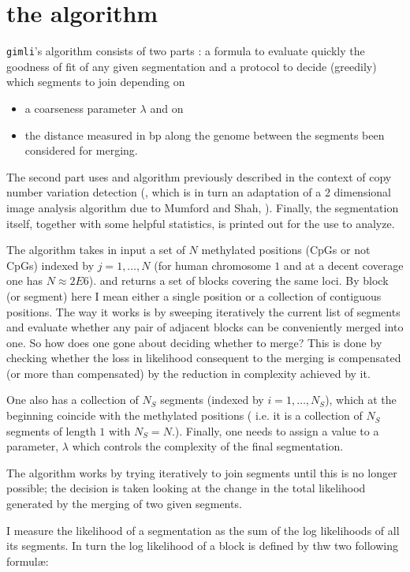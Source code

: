 \documentclass[11pt]{amsart}
\newcommand{\gimli}{\texttt{gimli}}
\begin{document}
\section{the algorithm}

\gimli's algorithm consists of two parts : 
a formula to evaluate quickly the 
goodness of fit of any given segmentation
and a protocol to decide (greedily) which  segments to join depending on
\begin{itemize}
\item{}a coarseness parameter $\lambda$ and on 
\item{}the distance measured in bp along
the genome between the segments been considered for merging. 
\end{itemize}
The second part uses and  algorithm previously described   in 
the context of copy number variation detection (\cite{vega}, which is in 
turn an adaptation 
of a 2 dimensional image analysis algorithm due to Mumford and Shah, 
\cite{mumfordshah}). Finally, the segmentation itself, together with some 
helpful statistics, is printed out for the use to analyze.

The algorithm takes in input a set of $N$ methylated positions 
(CpGs or not CpGs) indexed by $j=1,\dots,N$ 
(for human chromosome $1$ and at a 
decent coverage one has $N \approx 2E6$).
and returns a set of blocks covering the same loci.
By block (or segment) here I mean either a single position or a collection
of contiguous positions. The way it works is by sweeping
iteratively the current list of segments and evaluate whether any pair 
of adjacent blocks can be conveniently merged into one. So how does one gone 
about deciding whether to merge? This is  done by checking whether the loss in 
likelihood consequent to the merging is compensated (or more than compensated)
by the reduction in complexity achieved by it.

One also has a collection of $N_S$ 
segments (indexed by $i=1,\dots,N_S$), 
which at the beginning
coincide with the methylated positions ( i.e. it is a collection of $N_S$ 
segments of length $1$ with $N_S=N$.).
Finally, one needs to assign a value to a parameter, $\lambda$ which controls the 
complexity of the final segmentation.

The algorithm works by trying iteratively to join segments until this
is no longer possible; the decision is taken looking at the change
in the total likelihood generated by the merging of two given segments. 

I measure the likelihood of a segmentation as the sum of the log likelihoods
of all its segments. In turn the log likelihood of a block is defined by thw
two following formul\ae:
\end{document}

